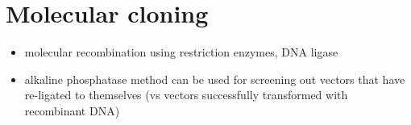 \documentclass[10pt]{article}
\newenvironment{mitemize}
{
  \begin{itemize}
  \setlength{\itemsep}{1pt}
  \setlength{\parskip}{0pt}
  \setlength{\parsep}{0pt}}{\end{itemize}
}
\begin{document}
\section*{Molecular cloning}
\begin{mitemize}
  \item molecular recombination using restriction enzymes, DNA ligase
  \item alkaline phosphatase method can be used for screening out vectors that have re-ligated to themselves (vs vectors successfully transformed with recombinant DNA)
\end{mitemize}
\end{document}
